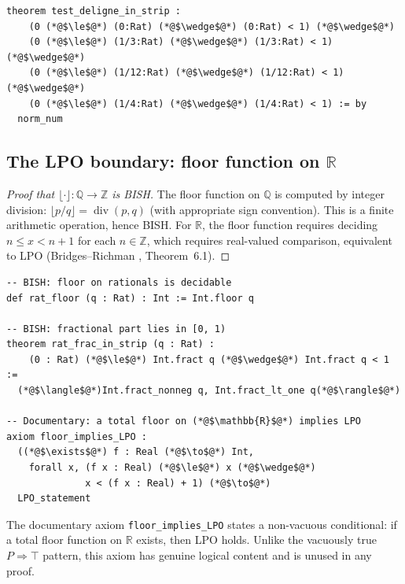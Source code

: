 \documentclass[11pt,a4paper]{article}
\theoremstyle{plain}
\theoremstyle{definition}
\newcommand{\BISH}{\textsf{BISH}}
\newcommand{\LPO}{\textsf{LPO}}
\newcommand{\Z}{\mathbb{Z}}
\newcommand{\Q}{\mathbb{Q}}
\newcommand{\R}{\mathbb{R}}
\begin{document}
\begin{tcolorbox}[leanbox={Deligne strip (Paper106\_RiemannHilbert.lean)}]
\begin{lstlisting}[style=leanstyle]
theorem test_deligne_in_strip :
    (0 (*@$\le$@*) (0:Rat) (*@$\wedge$@*) (0:Rat) < 1) (*@$\wedge$@*)
    (0 (*@$\le$@*) (1/3:Rat) (*@$\wedge$@*) (1/3:Rat) < 1) (*@$\wedge$@*)
    (0 (*@$\le$@*) (1/12:Rat) (*@$\wedge$@*) (1/12:Rat) < 1) (*@$\wedge$@*)
    (0 (*@$\le$@*) (1/4:Rat) (*@$\wedge$@*) (1/4:Rat) < 1) := by
  norm_num
\end{lstlisting}
\end{tcolorbox}

\subsection{The \LPO{} boundary: floor function on $\R$}

\begin{proof}[Proof that $\lfloor \cdot \rfloor : \Q \to \Z$ is \BISH]
The floor function on $\Q$ is computed by integer division: $\lfloor p/q \rfloor = \operatorname{div}(p, q)$ (with appropriate sign convention).
This is a finite arithmetic operation, hence \BISH.
For $\R$, the floor function requires deciding $n \le x < n+1$ for each $n \in \Z$, which requires real-valued comparison, equivalent to \LPO{} (Bridges--Richman \cite{BridgesRichman1987}, Theorem~6.1).
\end{proof}

\begin{tcolorbox}[leanbox={Floor function on Q -- Paper106\_RiemannHilbert.lean}]
\begin{lstlisting}[style=leanstyle]
-- BISH: floor on rationals is decidable
def rat_floor (q : Rat) : Int := Int.floor q

-- BISH: fractional part lies in [0, 1)
theorem rat_frac_in_strip (q : Rat) :
    (0 : Rat) (*@$\le$@*) Int.fract q (*@$\wedge$@*) Int.fract q < 1 :=
  (*@$\langle$@*)Int.fract_nonneg q, Int.fract_lt_one q(*@$\rangle$@*)

-- Documentary: a total floor on (*@$\mathbb{R}$@*) implies LPO
axiom floor_implies_LPO :
  ((*@$\exists$@*) f : Real (*@$\to$@*) Int,
    forall x, (f x : Real) (*@$\le$@*) x (*@$\wedge$@*)
              x < (f x : Real) + 1) (*@$\to$@*)
  LPO_statement
\end{lstlisting}
\end{tcolorbox}

The documentary axiom \texttt{floor\_implies\_LPO} states a non-vacuous conditional: if a total floor function on $\R$ exists, then \LPO{} holds.
Unlike the vacuously true $P \Rightarrow \top$ pattern, this axiom has genuine logical content and is unused in any proof.
\end{document}
